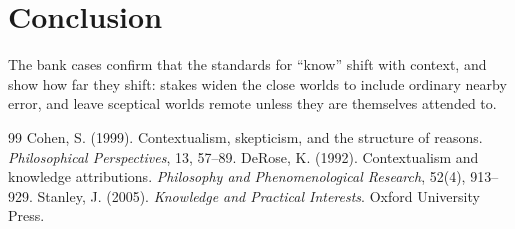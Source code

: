 \documentclass{situationist-preprint}
\begin{document}
\section{Conclusion}

The bank cases confirm that the standards for \enquote{know} shift with context, and show how far they shift: stakes widen the close worlds to include ordinary nearby error, and leave sceptical worlds remote unless they are themselves attended to.

\begin{thebibliography}{99}\small
{} Cohen, S. (1999). Contextualism, skepticism, and the structure of reasons. \emph{Philosophical Perspectives}, 13, 57--89.
 DeRose, K. (1992). Contextualism and knowledge attributions. \emph{Philosophy and Phenomenological Research}, 52(4), 913--929.
 Stanley, J. (2005). \emph{Knowledge and Practical Interests}. Oxford University Press.
\end{thebibliography}
\end{document}
